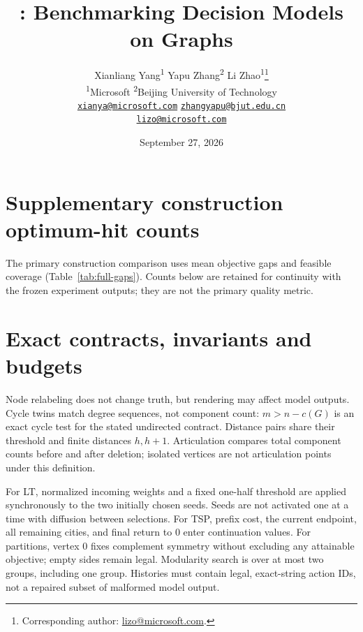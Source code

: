 \documentclass[11pt]{article}
\title{\bench: Benchmarking Decision Models on Graphs}
\author{Xianliang Yang\textsuperscript{1}\quad
Yapu Zhang\textsuperscript{2}\quad
Li Zhao\textsuperscript{1}\thanks{Corresponding author: \href{mailto:lizo@microsoft.com}{lizo@microsoft.com}.}\\[0.4em]
\small\textsuperscript{1}Microsoft\quad
\textsuperscript{2}Beijing University of Technology\\[0.3em]
\small\href{mailto:xianya@microsoft.com}{\texttt{xianya@microsoft.com}}\quad
\href{mailto:zhangyapu@bjut.edu.cn}{\texttt{zhangyapu@bjut.edu.cn}}\\
\small\href{mailto:lizo@microsoft.com}{\texttt{lizo@microsoft.com}}}
\date{September 27, 2026}
\begin{document}
\maketitle


\clearpage

{\raggedright}

\clearpage
\appendix



\section{Supplementary construction optimum-hit counts}
\label{app:construction-hits}
The primary construction comparison uses mean objective gaps and feasible
coverage (Table~\ref{tab:full-gaps}). Counts below are retained for continuity
with the frozen experiment outputs; they are not the primary quality metric.
\begin{table}[ht]
\centering\small

\caption{Supplementary complete canonical optimum hits over all forty
scheduled episodes per task. All tied optima are accepted. Laya's nine LT
input rejects and GPT-5.4's nine timeouts remain in denominators.}
\label{tab:full-optimal}
\end{table}



\section{Exact contracts, invariants and budgets}
\label{app:contracts}
Node relabeling does not change truth, but rendering may affect model outputs.
Cycle twins match degree sequences, not component count: $m>n-c(G)$ is an
exact cycle test for the stated undirected contract. Distance pairs share
their threshold and finite distances $h,h+1$. Articulation compares total
component counts before and after deletion; isolated vertices are not
articulation points under this definition.

For LT, normalized incoming weights and a fixed one-half threshold are applied
synchronously to the two initially chosen seeds. Seeds are not activated one
at a time with diffusion between selections. For TSP, prefix cost, the current
endpoint, all remaining cities, and final return to 0 enter continuation
values. For partitions, vertex 0 fixes complement symmetry without excluding
any attainable objective; empty sides remain legal. Modularity search is over
at most two groups, including one group. Histories must contain legal,
exact-string action IDs, not a repaired subset of malformed model output.
\end{document}
